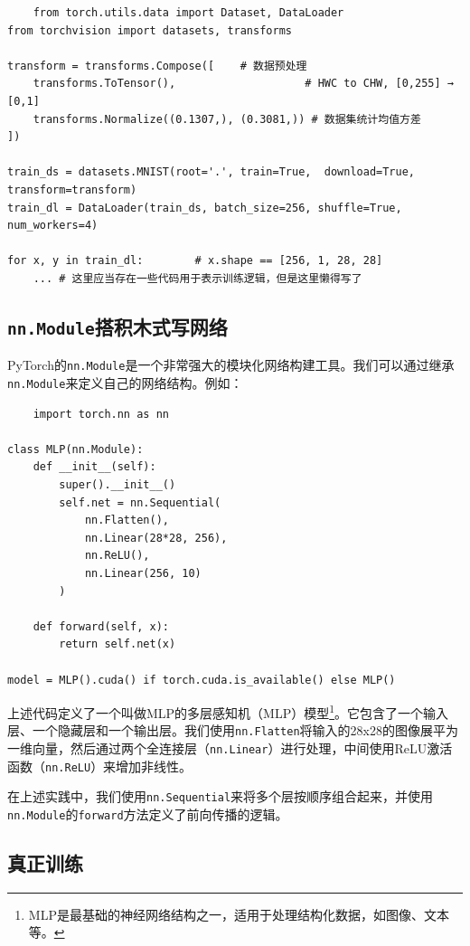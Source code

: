 \documentclass[../main.tex]{subfiles}
\begin{document}
\begin{lstlisting}
    from torch.utils.data import Dataset, DataLoader
from torchvision import datasets, transforms

transform = transforms.Compose([    # 数据预处理
    transforms.ToTensor(),                    # HWC to CHW, [0,255] → [0,1]
    transforms.Normalize((0.1307,), (0.3081,)) # 数据集统计均值方差
])

train_ds = datasets.MNIST(root='.', train=True,  download=True, transform=transform)
train_dl = DataLoader(train_ds, batch_size=256, shuffle=True, num_workers=4)

for x, y in train_dl:        # x.shape == [256, 1, 28, 28]
    ... # 这里应当存在一些代码用于表示训练逻辑，但是这里懒得写了
\end{lstlisting}

\subsection{\texttt{nn.Module}搭积木式写网络}

PyTorch的\texttt{nn.Module}是一个非常强大的模块化网络构建工具。我们可以通过继承\texttt{nn.Module}来定义自己的网络结构。例如：

\begin{lstlisting}
    import torch.nn as nn

class MLP(nn.Module):
    def __init__(self):
        super().__init__()
        self.net = nn.Sequential(
            nn.Flatten(),
            nn.Linear(28*28, 256),
            nn.ReLU(),
            nn.Linear(256, 10)
        )

    def forward(self, x):
        return self.net(x)

model = MLP().cuda() if torch.cuda.is_available() else MLP()
\end{lstlisting}

上述代码定义了一个叫做MLP的多层感知机（MLP）模型\footnote{MLP是最基础的神经网络结构之一，适用于处理结构化数据，如图像、文本等。}。它包含了一个输入层、一个隐藏层和一个输出层。我们使用\texttt{nn.Flatten}将输入的28x28的图像展平为一维向量，然后通过两个全连接层（\texttt{nn.Linear}）进行处理，中间使用ReLU激活函数（\texttt{nn.ReLU}）来增加非线性。

在上述实践中，我们使用\texttt{nn.Sequential}来将多个层按顺序组合起来，并使用\texttt{nn.Module}的\texttt{forward}方法定义了前向传播的逻辑。

\subsection{真正训练}
\end{document}
